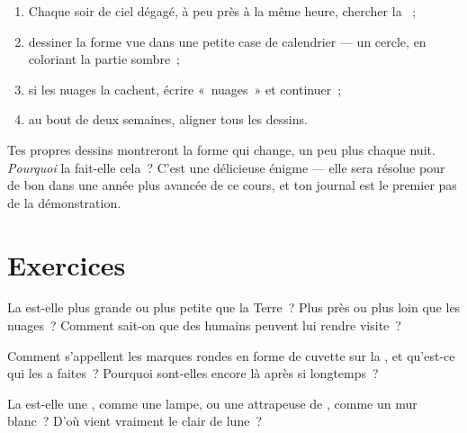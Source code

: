 \begin{method}\label{met:g2:moon-in-the-sky:diary}
\begin{enumerate}
  \item Chaque soir de ciel dégagé, à peu près à la même heure,
        chercher la ~;
  \item dessiner la forme vue dans une petite case de calendrier ---
        un cercle, en coloriant la partie sombre~;
  \item si les nuages la cachent, écrire «~nuages~» et continuer~;
  \item au bout de deux semaines, aligner tous les dessins.
\end{enumerate}
Tes propres dessins montreront la forme qui change, un peu plus
chaque nuit. \emph{Pourquoi} la  fait-elle cela~? C'est une
délicieuse énigme --- elle sera résolue pour de bon dans une année
plus avancée de ce cours, et ton journal est le premier pas de la
démonstration.
\end{method}

\section{Exercices}

\begin{exercise}[$\star$]\label{exo:g2:moon-in-the-sky:1}
La  est-elle plus grande ou plus petite que la Terre~? Plus près
ou plus loin que les nuages~? Comment sait-on que des humains peuvent
lui rendre visite~?
\end{exercise}

\begin{exercise}[$\star$]\label{exo:g2:moon-in-the-sky:2}
Comment s'appellent les marques rondes en forme de cuvette sur la
, et qu'est-ce qui les a faites~? Pourquoi sont-elles encore là
après si longtemps~?
\end{exercise}

\begin{exercise}[$\star$]\label{exo:g2:moon-in-the-sky:3}
La  est-elle une , comme une lampe, ou une
attrapeuse de , comme un mur blanc~? D'où vient vraiment le
clair de lune~?
\end{exercise}

